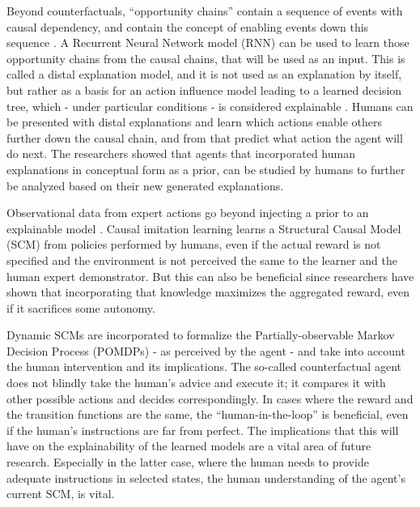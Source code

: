 \documentclass[twoside,11pt]{article}
\begin{document}
Beyond counterfactuals, ``opportunity chains'' contain a sequence of events with causal dependency, and contain the concept of enabling events down this sequence \cite{Madumal:2020:DistalEF}. A Recurrent Neural Network model (RNN) \cite{Hochreiter:1997:Lstm} can be used to learn those opportunity chains from the causal chains, that will be used as an input. This is called a distal explanation model, and it is not used as an explanation by itself, but rather as a basis for an action influence model leading to a learned decision tree, which - under particular conditions - is considered explainable \cite{Jung:2020:ExplainableEmpiricalRiskMinimization}. Humans can be presented with distal explanations and learn which actions enable others further down the causal chain, and from that predict what action the agent will do next. The researchers showed that agents that incorporated human explanations in conceptual form as a prior, can be studied by humans to further be analyzed based on their new generated explanations.

Observational data from expert actions go beyond injecting a prior to an explainable model \cite{Zhang:2020:CausalImitationLearning}. Causal imitation learning learns a Structural Causal Model (SCM) \cite{Pearl:2000:ModelsReasoningInference} from policies performed by humans, even if the actual reward is not specified and the environment is not perceived the same to the learner and the human expert demonstrator. But this can also be beneficial since researchers have shown that incorporating that knowledge maximizes the aggregated reward, even if it sacrifices some autonomy. 

Dynamic SCMs are incorporated to formalize the Partially-observable Markov Decision Process (POMDPs) \cite{SuttonBarto:2018:RLIntroduction} - as perceived by the agent - and take into account the human intervention and its implications. The so-called counterfactual agent does not blindly take the human's advice and execute it; it compares it with other possible actions and decides correspondingly. In cases where the reward and the transition functions are the same, the ``human-in-the-loop'' is beneficial, even if the human's instructions are far from perfect. The implications that this will have on the explainability of the learned models are a vital area of future research. Especially in the latter case, where the human needs to provide adequate instructions in selected states, the human understanding of the agent's current SCM, is vital.  
\end{document}
